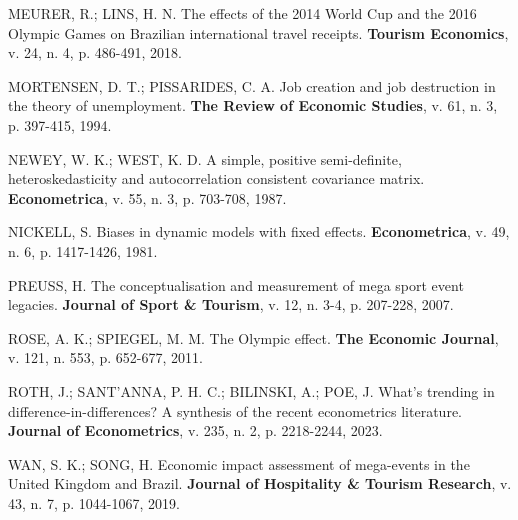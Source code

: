 \begin{singlespace}
MEURER, R.; LINS, H. N. The effects of the 2014 World Cup and the 2016 Olympic Games on Brazilian international travel receipts. \textbf{Tourism Economics}, v. 24, n. 4, p. 486-491, 2018.

MORTENSEN, D. T.; PISSARIDES, C. A. Job creation and job destruction in the
theory of unemployment. \textbf{The Review of Economic Studies}, v. 61, n. 3,
p. 397-415, 1994.

NEWEY, W. K.; WEST, K. D. A simple, positive semi-definite, heteroskedasticity and autocorrelation consistent covariance matrix. \textbf{Econometrica}, v. 55, n. 3, p. 703-708, 1987.

NICKELL, S. Biases in dynamic models with fixed effects. \textbf{Econometrica}, v. 49, n. 6, p. 1417-1426, 1981.

PREUSS, H. The conceptualisation and measurement of mega sport event
legacies. \textbf{Journal of Sport \& Tourism}, v. 12, n. 3-4, p. 207-228,
2007.

ROSE, A. K.; SPIEGEL, M. M. The Olympic effect. \textbf{The Economic Journal}, v. 121, n. 553, p. 652-677, 2011.

ROTH, J.; SANT'ANNA, P. H. C.; BILINSKI, A.; POE, J. What's trending in difference-in-differences? A synthesis of the recent econometrics literature. \textbf{Journal of Econometrics}, v. 235, n. 2, p. 2218-2244, 2023.

WAN, S. K.; SONG, H. Economic impact assessment of mega-events in the United
Kingdom and Brazil. \textbf{Journal of Hospitality \& Tourism Research},
v. 43, n. 7, p. 1044-1067, 2019.

\end{singlespace}
